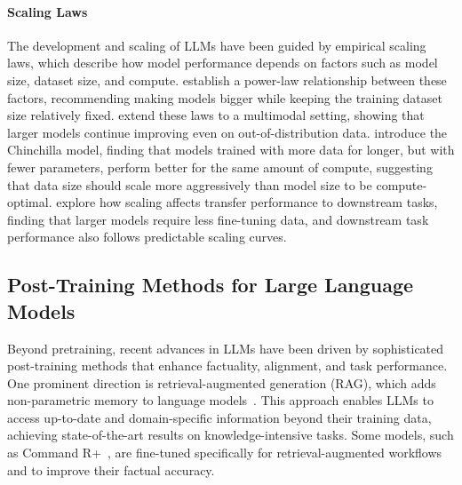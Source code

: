 \paragraph{Scaling Laws}

The development and scaling of LLMs have been guided by empirical scaling laws, which describe how model performance depends on factors such as model size, dataset size, and compute. \citet{kaplan2020scaling} establish a power-law relationship between these factors, recommending making models bigger while keeping the training dataset size relatively fixed. \citet{henighan2020scaling} extend these laws to a multimodal setting, showing that larger models continue improving even on out-of-distribution data. \citet{hoffman2022chinchilla} introduce the Chinchilla model, finding that models trained with more data for longer, but with fewer parameters, perform better for the same amount of compute, suggesting that data size should scale more aggressively than model size to be compute-optimal. \citet{hernandez2021scaling} explore how scaling affects transfer performance to downstream tasks, finding that larger models require less fine-tuning data, and downstream task performance also follows predictable scaling curves.

\subsection{Post-Training Methods for Large Language Models}

Beyond pretraining, recent advances in LLMs have been driven by sophisticated post-training methods that enhance factuality, alignment, and task performance. One prominent direction is retrieval-augmented generation (RAG), which adds non-parametric memory to language models~\citep{lewis2020retrieval}. This approach enables LLMs to access up-to-date and domain-specific information beyond their training data, achieving state-of-the-art results on knowledge-intensive tasks. Some models, such as Command R+~\citep{cohere2024commandrplus}, are fine-tuned specifically for retrieval-augmented workflows and to improve their factual accuracy.


